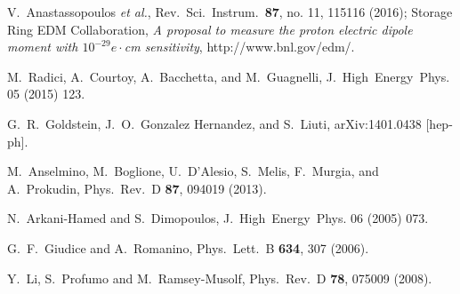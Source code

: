 \documentclass[aps,prd,twocolumn,groupedaddress,showpacs,superscriptaddress,floatfix,nofootinbib,10pt]{revtex4-1}
\begin{document}
\begin{thebibliography}{}
  
  V.~Anastassopoulos {\it et al.},
  Rev.\ Sci.\ Instrum.\  {\bf 87}, no. 11, 115116 (2016); 
  Storage Ring EDM Collaboration, {\it A proposal to measure the proton electric dipole moment with $10^{-29}e\cdot$cm sensitivity}, http://www.bnl.gov/edm/.

  M.~Radici, A.~Courtoy, A.~Bacchetta, and M.~Guagnelli,
  J.\ High\ Energy\ Phys. 05 (2015) 123.


  G.~R.~Goldstein, J.~O.~Gonzalez Hernandez, and S.~Liuti,
  arXiv:1401.0438 [hep-ph].


  M.~Anselmino, M.~Boglione, U.~D'Alesio, S.~Melis, F.~Murgia, and A.~Prokudin,
  Phys.\ Rev.\ D {\bf 87}, 094019 (2013).


  N.~Arkani-Hamed and S.~Dimopoulos,
  J.\ High\ Energy\ Phys. 06 (2005) 073.


  G.~F.~Giudice and A.~Romanino,
  Phys.\ Lett.\ B {\bf 634}, 307 (2006).


  Y.~Li, S.~Profumo and M.~Ramsey-Musolf,
  Phys.\ Rev.\ D {\bf 78}, 075009 (2008).


\end{thebibliography}
\end{document}
